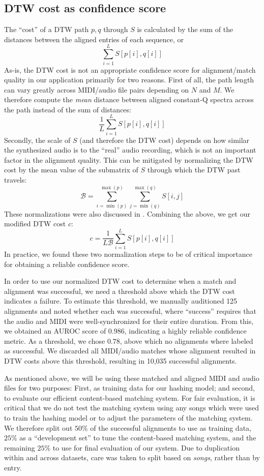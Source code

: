 \documentclass{article}
\begin{document}
\subsection{DTW cost as confidence score}

The ``cost'' of a DTW path $p, q$ through $S$ is calculated by the sum of the distances between the aligned entries of each sequence, or
$$
\sum_{i = 1}^L S[p[i], q[i]]
$$
As-is, the DTW cost is not an appropriate confidence score for alignment/match quality in our application primarily for two reasons.
First of all, the path length can vary greatly across MIDI/audio file pairs depending on $N$ and $M$.
We therefore compute the \textit{mean} distance between aligned constant-Q spectra across the path instead of the sum of distances:
$$
\frac{1}{L}\sum_{i = 1}^L S[p[i], q[i]]
$$
Secondly, the scale of $S$ (and therefore the DTW cost) depends on how similar the synthesized audio is to the ``real'' audio recording, which is not an important factor in the alignment quality.
This can be mitigated by normalizing the DTW cost by the mean value of the submatrix of $S$ through which the DTW past travels:
$$
\mathcal{B} = \sum_{i = \min(p)}^{\max(p)} \sum_{j = \min(q)}^{\max(q)} S[i, j] 
$$
These normalizations were also discussed in \cite{hu2003polyphonic}.
Combining the above, we get our modified DTW cost $c$:
$$
c = \frac{1}{L \mathcal{B}} \sum_{i = 1}^L S[p[i], q[i]]
$$
In practice, we found these two normalization steps to be of critical importance for obtaining a reliable confidence score.

In order to use our normalized DTW cost to determine when a match and alignment was successful, we need a threshold above which the DTW cost indicates a failure.
To estimate this threshold, we manually auditioned 125 alignments and noted whether each was successful, where ``success'' requires that the audio and MIDI were well-synchronized for their entire duration.
From this, we obtained an AUROC score of $0.986$, indicating a highly reliable confidence metric.
As a threshold, we chose $0.78$, above which no alignments where labeled as successful.
We discarded all MIDI/audio matches whose alignment resulted in DTW costs above this threshold, resulting in 10,035 successful alignments.

As mentioned above, we will be using these matched and aligned MIDI and audio files for two purposes: First, as training data for our hashing model; and second, to evaluate our efficient content-based matching system.
For fair evaluation, it is critical that we do not test the matching system using any songs which were used to train the hashing model or to adjust the parameters of the matching system.
We therefore split out $50\%$ of the successful alignments to use as training data, $25\%$ as a ``development set'' to tune the content-based matching system, and the remaining $25\%$ to use for final evaluation of our system.
Due to duplication within and across datasets, care was taken to split based on \textit{songs}, rather than by entry.
\end{document}
